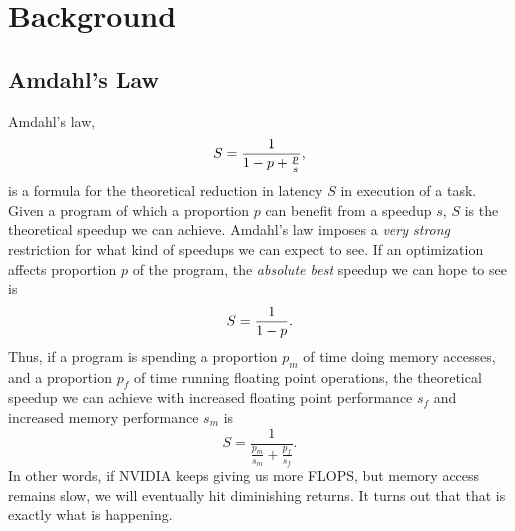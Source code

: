 \chapter{Background}
\label{chap:background}


\section{Amdahl's Law}
\label{sec:amdahl}
Amdahl's law,
\begin{equation}
\label{eq:amdahl}
    S = \frac 1 {1 - p + \frac p s} \text,
\end{equation}
is a formula for the theoretical reduction in latency $S$ in execution of a task.
Given a program of which a proportion $p$ can benefit from a speedup $s$,
$S$ is the theoretical speedup we can achieve.
Amdahl's law imposes a {\em very strong} restriction for what kind of speedups we
can expect to see. If an optimization affects proportion $p$ of the program,
the {\em absolute best} speedup we can hope to see is
$$
S = \frac 1 {1 - p} \text.
$$
Thus, if a program is spending a proportion $p_m$ of time doing memory accesses,
and a proportion $p_f$ of time running floating point operations, the theoretical
speedup we can achieve with increased floating point performance $s_f$ and increased
memory performance $s_m$ is
$$
S = \frac 1 {\frac {p_m} {s_m} + \frac {p_f} {s_f}}.
$$
In other words, if NVIDIA keeps giving us more FLOPS, but memory access remains slow,
we will eventually hit diminishing returns.
It turns out that that is exactly what is happening.


